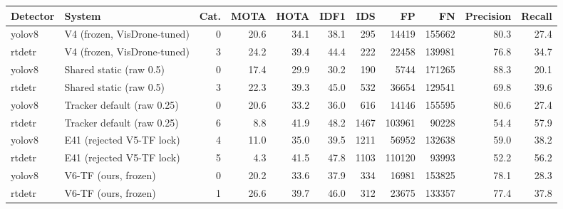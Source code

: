 \begin{tabular}{llrrrrrrrrr}
\toprule
Detector & System & Cat. & MOTA & HOTA & IDF1 & IDS & FP & FN & Precision & Recall \\
\midrule
yolov8 & V4 (frozen, VisDrone-tuned) & 0 & 20.6 & 34.1 & 38.1 & 295 & 14419 & 155662 & 80.3 & 27.4 \\
rtdetr & V4 (frozen, VisDrone-tuned) & 3 & 24.2 & 39.4 & 44.4 & 222 & 22458 & 139981 & 76.8 & 34.7 \\
yolov8 & Shared static (raw 0.5) & 0 & 17.4 & 29.9 & 30.2 & 190 & 5744 & 171265 & 88.3 & 20.1 \\
rtdetr & Shared static (raw 0.5) & 3 & 22.3 & 39.3 & 45.0 & 532 & 36654 & 129541 & 69.8 & 39.6 \\
yolov8 & Tracker default (raw 0.25) & 0 & 20.6 & 33.2 & 36.0 & 616 & 14146 & 155595 & 80.6 & 27.4 \\
rtdetr & Tracker default (raw 0.25) & 6 & 8.8 & 41.9 & 48.2 & 1467 & 103961 & 90228 & 54.4 & 57.9 \\
yolov8 & E41 (rejected V5-TF lock) & 4 & 11.0 & 35.0 & 39.5 & 1211 & 56952 & 132638 & 59.0 & 38.2 \\
rtdetr & E41 (rejected V5-TF lock) & 5 & 4.3 & 41.5 & 47.8 & 1103 & 110120 & 93993 & 52.2 & 56.2 \\
yolov8 & V6-TF (ours, frozen) & 0 & 20.2 & 33.6 & 37.9 & 334 & 16981 & 153825 & 78.1 & 28.3 \\
rtdetr & V6-TF (ours, frozen) & 1 & 26.6 & 39.7 & 46.0 & 312 & 23675 & 133357 & 77.4 & 37.8 \\
\bottomrule
\end{tabular}
